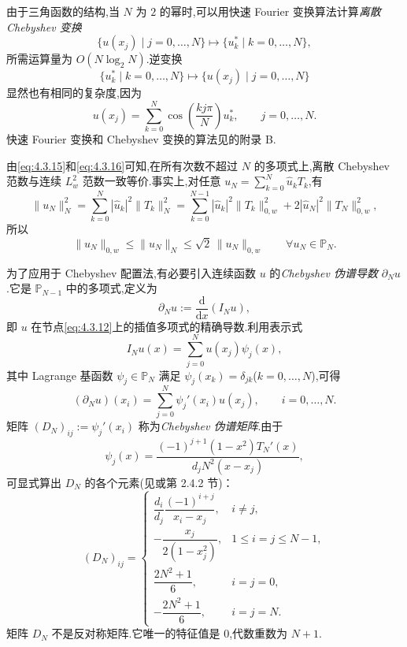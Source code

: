 由于三角函数的结构,当 \(N\) 为 \(2\) 的幂时,可以用快速 Fourier 变换算法计算\emph{离散 Chebyshev 变换}
\[
  \{u(x_j)\mid j=0,\ldots,N\}\longmapsto\{u_k^*\mid k=0,\ldots,N\},
\]
所需运算量为 \(O(N\log_2N)\).逆变换
\[
  \{u_k^*\mid k=0,\ldots,N\}\longmapsto\{u(x_j)\mid j=0,\ldots,N\}
\]
显然也有相同的复杂度,因为
\begin{equation}\label{eq:4.3.19}
  u(x_j)=\sum_{k=0}^N\cos\left(\frac{kj\pi}{N}\right)u_k^*,
   \qquad j=0,\ldots,N.
\end{equation}
快速 Fourier 变换和 Chebyshev 变换的算法见的附录 B.

由\eqref{eq:4.3.15}和\eqref{eq:4.3.16}可知,在所有次数不超过 \(N\) 的多项式上,离散 Chebyshev 范数与连续 \(L_w^2\) 范数一致等价.事实上,对任意 \(u_N=\sum_{k=0}^N\widehat u_kT_k\),有
\[
  \|u_N\|_N^2=\sum_{k=0}^N|\widehat u_k|^2\|T_k\|_N^2
    =\sum_{k=0}^{N-1}|\widehat u_k|^2\|T_k\|_{0,w}^2
      +2|\widehat u_N|^2\|T_N\|_{0,w}^2,
\]
所以
\begin{equation}\label{eq:4.3.20}
  \|u_N\|_{0,w}\le\|u_N\|_N\le\sqrt2\,\|u_N\|_{0,w}
  \qquad\forall u_N\in\mathbb P_N.
\end{equation}

为了应用于 Chebyshev 配置法,有必要引入连续函数 \(u\) 的\emph{Chebyshev 伪谱导数} \(\partial_Nu\).它是 \(\mathbb P_{N-1}\) 中的多项式,定义为
\begin{equation}\label{eq:4.3.21}
  \partial_Nu:=\frac{\mathrm d}{\mathrm dx}(I_Nu),
\end{equation}
即 \(u\) 在节点\eqref{eq:4.3.12}上的插值多项式的精确导数.利用表示式
\begin{equation}\label{eq:4.3.22}
  I_Nu(x)=\sum_{j=0}^N u(x_j)\psi_j(x),
\end{equation}
其中 Lagrange 基函数 \(\psi_j\in\mathbb P_N\) 满足 \(\psi_j(x_k)=\delta_{jk}\)(\(k=0,\ldots,N\)),可得
\begin{equation}\label{eq:4.3.23}
  (\partial_Nu)(x_i)=\sum_{j=0}^N\psi_j'(x_i)u(x_j),\qquad i=0,\ldots,N.
\end{equation}
矩阵 \((D_N)_{ij}:=\psi_j'(x_i)\) 称为\emph{Chebyshev 伪谱矩阵}.由于
\[
  \psi_j(x)=\frac{(-1)^{j+1}(1-x^2)T_N'(x)}{d_jN^2(x-x_j)},
\]
可显式算出 \(D_N\) 的各个元素(见或第 2.4.2 节)：
\begin{equation}\label{eq:4.3.24}
  (D_N)_{ij}=
  \begin{cases}
    \dfrac{d_i}{d_j}\dfrac{(-1)^{i+j}}{x_i-x_j},&i\ne j,\\[3pt]
    -\dfrac{x_j}{2(1-x_j^2)},&1\le i=j\le N-1,\\[3pt]
    \dfrac{2N^2+1}{6},&i=j=0,\\[3pt]
    -\dfrac{2N^2+1}{6},&i=j=N.
  \end{cases}
\end{equation}
矩阵 \(D_N\) 不是反对称矩阵.它唯一的特征值是 \(0\),代数重数为 \(N+1\).

